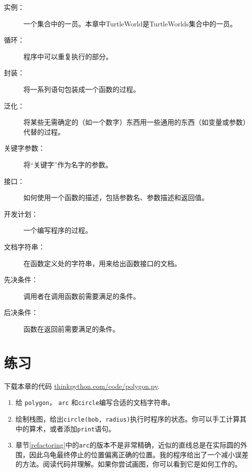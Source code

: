 \begin{description}

\item[实例：] 一个集合中的一员。本章中TurtleWorld是TurtleWorlds集合中的一员。

\item[循环：] 程序中可以重复执行的部分。

\item[封装：] 将一系列语句包装成一个函数的过程。

\item[泛化：] 将某些无需确定的（如一个数字）东西用一些通用的东西（如变量或参数）代替的过程。

\item[关键字参数：] 将“关键字”作为名字的参数。

\item[接口：] 如何使用一个函数的描述，包括参数名、参数描述和返回值。

\item[开发计划：] 一个编写程序的过程。

\item[文档字符串：] 在函数定义处的字符串，用来给出函数接口的文档。

\item[先决条件：] 调用者在调用函数前需要满足的条件。

\item[后决条件：] 函数在返回前需要满足的条件。

\end{description}


\section{练习}

\begin{ex}

下载本章的代码
\url{thinkpython.com/code/polygon.py}.

\begin{enumerate}

\item 给 {\tt polygon}， {\tt arc} 和{\tt circle}编写合适的文档字符串。


\item 绘制栈图，给出{\tt circle(bob, radius)}执行时程序的状态。你可以手工计算其中的算术，或者添加{\tt print}语句。

\item 章节\ref{refactoring}中的{\tt arc}的版本不是非常精确，近似的直线总是在实际圆的外围，因此乌龟最终停止的位置偏离正确的位置。我的程序给出了一个减小误差的方法。阅读代码并理解。如果你尝试画图，你可以看到它是如何工作的。

\end{enumerate}

\end{ex}



